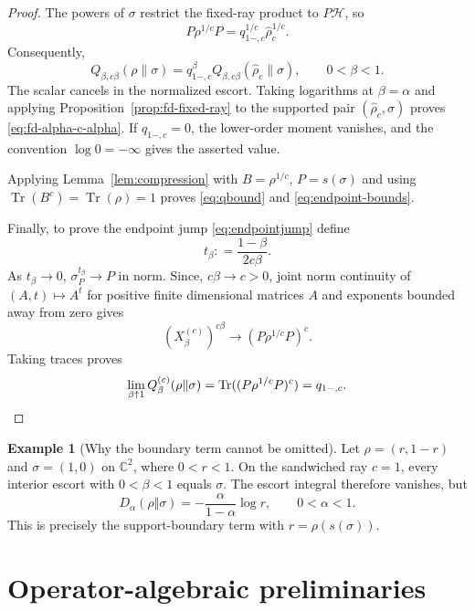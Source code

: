\documentclass[12pt]{article}
\numberwithin{equation}{section}
\theoremstyle{definition}
\newtheorem{example}[theorem]{Example}
\theoremstyle{remark}
\newcommand{\?}{\overset{?}{=}}
\newcommand{\defeq}{\mathrel{\mathop:}=}
\DeclareMathOperator{\Tr}{Tr}
\newcommand{\cH}{\mathcal{H}}
\begin{document}
\begin{proof}
The powers of $\sigma$ restrict the fixed-ray product to $P\cH$, so
\begin{equation}
  P\rho^{1/c}P=q_{1-,c}^{1/c}\widehat\rho_c^{1/c}.
\end{equation}
Consequently,
\begin{equation}
  Q_{\beta,c\beta}(\rho\|\sigma)
  =q_{1-,c}^{\beta}
   Q_{\beta,c\beta}(\widehat\rho_c\|\sigma),
  \qquad 0<\beta<1.
  \label{eq:fd-boundary-scaling}
\end{equation}
The scalar cancels in the normalized escort.  Taking logarithms at
$\beta=\alpha$ and applying Proposition~\ref{prop:fd-fixed-ray} to the
supported pair $(\widehat\rho_c,\sigma)$ proves
\eqref{eq:fd-alpha-c-alpha}.  
If $q_{1-,c}=0$, the lower-order moment
vanishes, and the convention $\log0=-\infty$ gives the asserted value.

Applying Lemma~\ref{lem:compression} with $B=\rho^{1/c}$, $P=s(\sigma)$ and using $\Tr(B^c)=\Tr(\rho)=1$ proves \eqref{eq:qbound} and \eqref{eq:endpoint-bounds}.

Finally, to prove the endpoint jump \eqref{eq:endpointjump} define
\[
    t_\beta\defeq\frac{1-\beta}{2c \beta}.
\]
As $t_\beta\longrightarrow0$, $\sigma_P^{t_\beta}\longrightarrow P $ in norm. Since, $c\beta \longrightarrow c>0$, joint norm continuity of $(A,t)\longmapsto A^t$ for positive finite dimensional matrices $A$ and exponents bounded away from zero gives
\[
   \left( X_{\beta}^{(c)}\right)^{c\beta}\longrightarrow (P \rho^{1/c} P)^c.
\]
Taking traces proves
\[
    \lim_{\beta\uparrow1} Q_\beta^{(c)}(\rho\|\sigma)= \Tr((P \rho^{1/c} P)^c)=q_{1-,c}. \qedhere
\]
\end{proof}

\begin{example}[Why the boundary term cannot be omitted]
\label{ex:two-point-boundary}
Let $\rho=(r,1-r)$ and $\sigma=(1,0)$ on $\mathbb C^2$, where
$0<r<1$.  On the sandwiched ray $c=1$, every interior escort with
$0<\beta<1$ equals $\sigma$.  The escort integral therefore vanishes, but
\begin{equation}
  D_\alpha(\rho\Vert\sigma)
  =-\frac{\alpha}{1-\alpha}\log r,
  \qquad 0<\alpha<1.
\end{equation}
This is precisely the support-boundary term with
$r=\rho(s(\sigma))$.
\end{example}

\section{Operator-algebraic preliminaries}
\label{sec:preliminaries}
\end{document}
